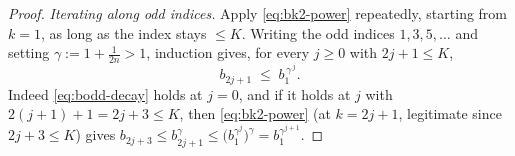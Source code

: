 \documentclass[11pt]{amsart}
\theoremstyle{definition}
\begin{document}
\begin{proof}
\emph{Iterating along odd indices.} Apply \eqref{eq:bk2-power} repeatedly,
starting from $k=1$, as long as the index stays $\le K$. Writing the odd
indices $1,3,5,\dots$ and setting $\gamma:=1+\tfrac1{2n}>1$, induction
gives, for every $j\ge0$ with $2j+1\le K$,
\begin{equation}\label{eq:bodd-decay}
   b_{2j+1}\;\le\;b_1^{\,\gamma^{\,j}} .
\end{equation}
Indeed \eqref{eq:bodd-decay} holds at $j=0$, and if it holds at $j$ with
$2(j+1)+1=2j+3\le K$, then \eqref{eq:bk2-power} (at $k=2j+1$, legitimate
since $2j+3\le K$) gives
$b_{2j+3}\le b_{2j+1}^{\gamma}\le\bigl(b_1^{\gamma^{j}}\bigr)^{\gamma}
=b_1^{\gamma^{j+1}}$.


\end{proof}
\end{document}
